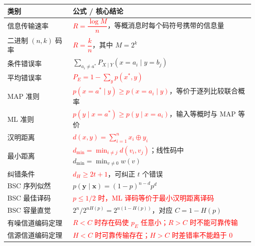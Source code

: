 {\scriptsize
\begin{tabularx}{\textwidth}{@{}l>{\raggedright\arraybackslash}X@{}}
\toprule
\textbf{类别} & \textbf{公式 / 核心结论} \\
\midrule
信息传输速率 & \textcolor{Red}{$R=\dfrac{\log M}{n}$}，等概消息时每个码符号携带的信息量 \\
\midrule
二进制 $(n,k)$ 码率 & \textcolor{Red}{$R=\dfrac{k}{n}$}，其中 $M=2^k$ \\
\midrule
条件错误率 & $\sum_{a_i\ne a^*}P_{X\mid Y}(x=a_i\mid y=b_j)$ \\
\midrule
平均错误率 & \textcolor{Red}{$P_E=1-\sum_y p(x^*,y)$} \\
\midrule
MAP 准则 & \textcolor{Red}{$p(x=a^*\mid y)\ge p(x=a_i\mid y)$}，等价于逐列比较联合概率 \\
\midrule
ML 准则 & \textcolor{Red}{$p(y\mid x=a^*)\ge p(y\mid x=a_i)$}，输入等概时与 MAP 等价 \\
\midrule
汉明距离 & \textcolor{Red}{$d(x,y)=\sum_{i=1}^{n}x_i\oplus y_i$} \\
\midrule
最小距离 & \textcolor{Red}{$d_{\min}=\min_{i\ne j}d(v_i,v_j)$}；线性码中 $d_{\min}=\min_{v\ne0}w(v)$ \\
\midrule
纠错条件 & \textcolor{Red}{$d_H\ge2t+1$}，可纠正 $t$ 个错误 \\
\midrule
BSC 序列似然 & $p(\mathbf{y}\mid\mathbf{x})=(1-p)^{n-d}p^d$ \\
\midrule
BSC 最佳译码 & \textcolor{Red}{$p\le1/2$ 时，ML 译码等价于最小汉明距离译码} \\
\midrule
BSC 容量直觉 & $2^n/2^{nH(p)}=2^{n(1-H(p))}$，对应 $C=1-H(p)$ \\
\midrule
有噪信道编码定理 & \textcolor{Red}{$R<C$ 时存在码使 $p_E$ 任意小；$R>C$ 时不能可靠传输} \\
\midrule
信源信道编码定理 & \textcolor{Red}{$H<C$ 时可靠传输存在；$H>C$ 时差错率不能趋于 $0$} \\
\bottomrule
\end{tabularx}
}

